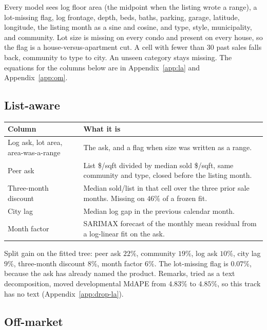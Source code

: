 \documentclass[11pt]{article}
\begin{document}
Every model sees log floor area (the midpoint when the listing wrote a range), a lot-missing flag, log frontage, depth, beds, baths, parking, garage, latitude, longitude, the listing month as a sine and cosine, and type, style, municipality, and community. Lot size is missing on every condo and present on every house, so the flag is a house-versus-apartment cut. A cell with fewer than 30 past sales falls back, community to type to city. An unseen category stays missing. The equations for the columns below are in Appendix~\ref{app:la} and Appendix~\ref{app:om}.

\subsection{List-aware}

\begin{center}
\small
\begin{tabular}{p{4.4cm}p{11.2cm}}
\toprule
Column & What it is \\
\midrule
Log ask, lot area, area-was-a-range & The ask, and a flag when size was written as a range. \\
Peer ask & List \$/sqft divided by median sold \$/sqft, same community and type, closed before the listing month. \\
Three-month discount & Median sold/list in that cell over the three prior sale months. Missing on \(46\%\) of a frozen fit. \\
City lag & Median log gap in the previous calendar month. \\
Month factor & SARIMAX forecast of the monthly mean residual from a log-linear fit on the ask. \\
\bottomrule
\end{tabular}
\end{center}

Split gain on the fitted tree: peer ask \(22\%\), community \(19\%\), log ask \(10\%\), city lag \(9\%\), three-month discount \(8\%\), month factor \(6\%\). The lot-missing flag is \(0.07\%\), because the ask has already named the product. Remarks, tried as a text decomposition, moved developmental MdAPE from \(4.83\%\) to \(4.85\%\), so this track has no text (Appendix~\ref{app:drop-la}).

\subsection{Off-market}
\end{document}
